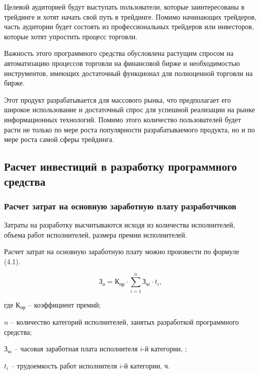 Целевой аудиторией будут выступать пользователи, которые заинтересованы в трейдинге и хотят начать свой путь в трейдинге.
Помимо начинающих трейдеров, часть аудитории будет состоять из профессиональных трейдеров или инвесторов,
которые хотят упростить процесс торговли.

Важность этого программного средства обусловлена растущим спросом на автоматизацию процессов торговли на финансовой бирже и необходимостью
инструментов, имеющих достаточный функционал для полноценной торговли на бирже.


Этот продукт разрабатывается для массового рынка, что предполагает его широкое использование и достаточный спрос для успешной реализации
на рынке информационных технологий.
Помимо этого количество пользователей будет расти не только по мере роста популярности разрабатываемого продукта, но и по мере роста самой сферы трейдинга.

\subsection{Расчет инвестиций в разработку программного средства}

\subsubsection{Расчет затрат на основную заработную плату разработчиков}

Затраты на разработку высчитываются исходя из количества исполнителей, объема работ исполнителей, размера премии исполнителей.

Расчет затрат на основную заработную плату можно произвести по формуле (4.1).

\begin{equation}
  \label{eq:econ:Zo}
  \text{З}_\text{о} = \text{К}_\text{пр} \cdot
    \sum_{i = 1}^{n} \text{З}_{\text{ч}i} \cdot t_i,
\end{equation}
\begin{explanationx}
  \item[где] $ \text{К}_\text{пр} $ -- коэффициент премий;
  \item $ n $ -- количество категорий исполнителей, занятых разработкой
  программного средства;
  \item $ \text{З}_{\text{ч}i} $ -- часовая заработная плата исполнителя $ i $-й категории, \rub;
  \item $ t_i $ -- трудоемкость работ исполнителя $ i $-й категории, ч.
\end{explanationx}

